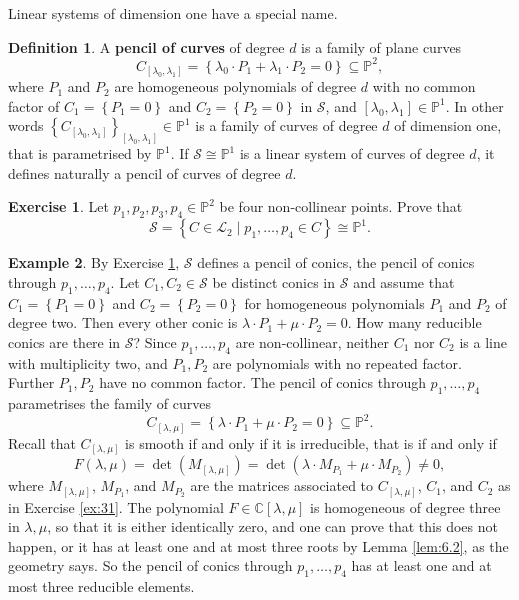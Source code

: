 \documentclass{article}
\newcommand{\C}{\mathbb{C}}
\renewcommand{\P}{\mathbb{P}}
\newcommand{\rb}[1]{\left( #1 \right)}
\renewcommand{\sb}[1]{\left[ #1 \right]}
\newcommand{\cb}[1]{\left\{ #1 \right\}}
\theoremstyle{definition}\newtheorem{definition}{Definition}[section]
\theoremstyle{definition}\newtheorem{notation}[definition]{Notation}
\theoremstyle{definition}\newtheorem{remark}[definition]{Remark}
\theoremstyle{definition}\newtheorem{example}[definition]{Example}
\theoremstyle{definition}\newtheorem{fact}{Fact}
\theoremstyle{definition}\newtheorem{exercise}{Exercise}
\begin{document}
Linear systems of dimension one have a special name.

\begin{definition}
A \textbf{pencil of curves} of degree $ d $ is a family of plane curves
$$ C_{\sb{\lambda_0, \lambda_1}} = \cb{\lambda_0 \cdot P_1 + \lambda_1 \cdot P_2 = 0} \subseteq \P^2, $$
where $ P_1 $ and $ P_2 $ are homogeneous polynomials of degree $ d $ with no common factor of $ C_1 = \cb{P_1 = 0} $ and $ C_2 = \cb{P_2 = 0} $ in $ \mathcal{S} $, and $ \sb{\lambda_0, \lambda_1} \in \P^1 $. In other words $ \cb{C_{\sb{\lambda_0, \lambda_1}}}_{\sb{\lambda_0, \lambda_1}} \in \P^1 $ is a family of curves of degree $ d $ of dimension one, that is parametrised by $ \P^1 $. If $ \mathcal{S} \cong \P^1 $ is a linear system of curves of degree $ d $, it defines naturally a pencil of curves of degree $ d $.
\end{definition}

\begin{exercise}
\label{ex:40}
Let $ p_1, p_2, p_3, p_4 \in \P^2 $ be four non-collinear points. Prove that
$$ \mathcal{S} = \cb{C \in \mathcal{L}_2 \mid p_1, \dots, p_4 \in C} \cong \P^1. $$
\end{exercise}

\begin{example}
By Exercise \ref{ex:40}, $ \mathcal{S} $ defines a pencil of conics, the pencil of conics through $ p_1, \dots, p_4 $. Let $ C_1, C_2 \in \mathcal{S} $ be distinct conics in $ \mathcal{S} $ and assume that $ C_1 = \cb{P_1 = 0} $ and $ C_2 = \cb{P_2 = 0} $ for homogeneous polynomials $ P_1 $ and $ P_2 $ of degree two. Then every other conic is $ \lambda \cdot P_1 + \mu \cdot P_2 = 0 $. How many reducible conics are there in $ \mathcal{S} $? Since $ p_1, \dots, p_4 $ are non-collinear, neither $ C_1 $ nor $ C_2 $ is a line with multiplicity two, and $ P_1, P_2 $ are polynomials with no repeated factor. Further $ P_1, P_2 $ have no common factor. The pencil of conics through $ p_1, \dots, p_4 $ parametrises the family of curves
$$ C_{\sb{\lambda, \mu}} = \cb{\lambda \cdot P_1 + \mu \cdot P_2 = 0} \subseteq \P^2. $$
Recall that $ C_{\sb{\lambda, \mu}} $ is smooth if and only if it is irreducible, that is if and only if
$$ F\rb{\lambda, \mu} = \det\rb{M_{\sb{\lambda, \mu}}} = \det\rb{\lambda \cdot M_{P_1} + \mu \cdot M_{P_2}} \ne 0, $$
where $ M_{\sb{\lambda, \mu}} $, $ M_{P_1} $, and $ M_{P_2} $ are the matrices associated to $ C_{\sb{\lambda, \mu}} $, $ C_1 $, and $ C_2 $ as in Exercise \ref{ex:31}. The polynomial $ F \in \C\sb{\lambda, \mu} $ is homogeneous of degree three in $ \lambda, \mu $, so that it is either identically zero, and one can prove that this does not happen, or it has at least one and at most three roots by Lemma \ref{lem:6.2}, as the geometry says. So the pencil of conics through $ p_1, \dots, p_4 $ has at least one and at most three reducible elements.
\end{example}
\end{document}
